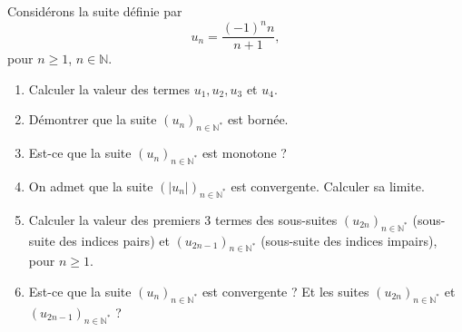


\begin{exercice}\label{exoDS_2010_5bis}

Considérons la suite définie par 
\begin{equation}
  u_n= \frac{(-1)^n n}{n+1}, 
\end{equation}
pour $n\geq 1$, $n\in\mathbb{N}$.
 
\begin{enumerate}
\item Calculer la valeur des termes $u_1, u_2, u_3$ et $u_4$.
  \item Démontrer que la suite $(u_n)_{n\in\mathbb{N}^*}$ est bornée.
    \item Est-ce que la suite $(u_n)_{n\in\mathbb{N}^*}$ est monotone ? 
      \item On admet que la suite $(|u_n|)_{n\in\mathbb{N}^*}$ est convergente. Calculer sa limite.
        \item Calculer la valeur des premiers 3 termes des sous-suites $(u_{2n})_{n\in\mathbb{N}^*}$ (sous-suite des indices pairs) et $(u_{2n-1})_{n\in\mathbb{N}^*}$ (sous-suite des indices impairs), pour $n\geq 1$. 
          \item Est-ce que la suite $(u_n)_{n\in\mathbb{N}^*}$ est convergente ? Et les suites $(u_{2n})_{n\in\mathbb{N}^*}$  et $(u_{2n-1})_{n\in\mathbb{N}^*}$ ?
\end{enumerate}


\end{exercice}
